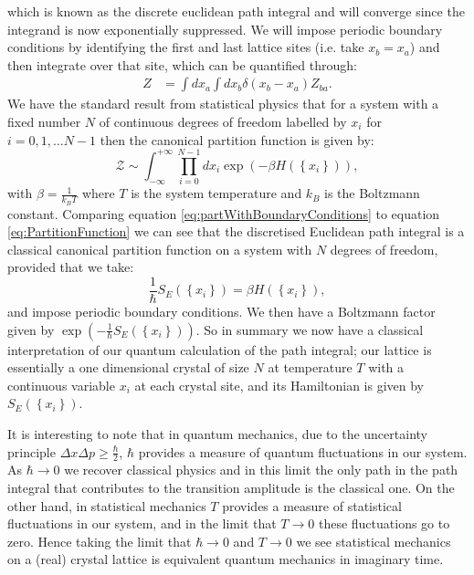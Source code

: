 \documentclass[12pt]{article}
\begin{document}
        which is known as the discrete euclidean path integral and will converge since the integrand is now exponentially suppressed. We will impose periodic boundary conditions by identifying the first and last lattice sites (i.e. take $x_b=x_a$) and then integrate over that site, which can be quantified through: 
        \begin{align}
            \label{eq:partWithBoundaryConditions}
            Z & = \int dx_a \int dx_b \delta\left(x_b-x_a\right)Z_{ba}.
        \end{align}
        We have the standard result from statistical physics that for a system with a fixed number $N$ of continuous degrees of freedom labelled by $x_i$ for $i=0,1,\dots N-1$ then the canonical partition function is given by:
        \begin{equation}
            \label{eq:PartitionFunction}
            \mathcal{Z} \sim \int_{-\infty}^{+\infty}\prod_{i=0}^{N-1}dx_{i}\exp{\left(-\beta H\left(\left\{x_i\right\}\right)\right)},
        \end{equation}
        with $\beta=\frac{1}{k_{B}T}$ where $T$ is the system temperature and $k_{B}$ is the Boltzmann constant. Comparing equation \ref{eq:partWithBoundaryConditions} to equation \ref{eq:PartitionFunction} we can see that the discretised Euclidean path integral is a classical canonical partition function on a system with $N$ degrees of freedom, provided that we take:
        \begin{equation}
            \label{ActionToHamiltonian}
            \frac{1}{\hbar}S_{E}\left(\left\{x_{i}\right\}\right) = \beta H\left(\left\{x_{i}\right\}\right),
        \end{equation}
        and impose periodic boundary conditions. We then have a Boltzmann factor given by $\exp{\left(-\frac{1}{\hbar}S_{E}\left(\left\{x_{i}\right\}\right)\right)}$. So in summary we now have a classical interpretation of our quantum calculation of the path integral; our lattice is essentially a one dimensional crystal of size $N$ at temperature $T$ with a continuous variable $x_i$ at each crystal site, and its Hamiltonian is given by $S_E\left(\left\{x_i\right\}\right)$.

        It is interesting to note that in quantum mechanics, due to the uncertainty principle $\Delta x\Delta p \geq \frac{\hbar}{2}$, $\hbar$ provides a measure of quantum fluctuations in our system. As $\hbar \rightarrow 0$ we recover classical physics and in this limit the only path in the path integral that contributes to the transition amplitude is the classical one. On the other hand, in statistical mechanics $T$ provides a measure of statistical fluctuations in our system, and in the limit that $T \rightarrow 0$ these fluctuations go to zero. Hence taking the limit that $\hbar \rightarrow 0$ and $T \rightarrow 0$ we see statistical mechanics on a (real) crystal lattice is equivalent quantum mechanics in imaginary time.
\end{document}
